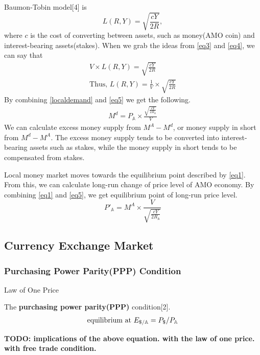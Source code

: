 \documentclass[a4paper,11pt]{scrartcl}
\newcommand{\usd}{\text{\textdollar}}
\newcommand{\amom}{\mathbb{A}}
\begin{document}
Baumon-Tobin model[4] is
\begin{equation}
	L(R, Y) = \sqrt{\frac{cY}{2R}}, \label{eq4}
\end{equation}
where $c$ is the cost of converting between assets, such as money(AMO coin) and
interest-bearing assets(stakes).
When we grab the ideas from \eqref{eq3} and \eqref{eq4}, we can say that
\begin{eqnarray}
	V \times L(R, Y) = \sqrt{\frac{cY}{2R}} \\
	\text{Thus,\ } L(R, Y) = \frac{1}{V} \times \sqrt{\frac{cY}{2R}} \label{eq5}
\end{eqnarray}
By combining \eqref{localdemand} and \eqref{eq5} we get the following.
\begin{eqnarray}
	M^d = P_\amom \times \frac{\sqrt{\frac{cY}{2R_\amom}}}{V}
\end{eqnarray}
We can calculate excess money supply from $M^A - M^d$, or money supply in short
from $M^d - M^A$. The excess money supply tends to be converted into
interest-bearing assets such as stakes, while the money supply in short tends
to be compensated from stakes.

Local money market moves towards the equilibrium point described by
\eqref{eq1}. From this, we can calculate long-run change of price level of AMO
economy. By combining \eqref{eq1} and \eqref{eq5}, we get equilibrium point of
long-run price level.
\begin{equation}
	P'_\amom = M^A \times \frac{V}{\sqrt{\frac{cY}{2R_\amom}}}
\end{equation}

\subsection{Currency Exchange Market}

\subsubsection{Purchasing Power Parity(PPP) Condition}
Law of One Price

The \textbf{purchasing power parity(PPP)} condition[2].
\begin{eqnarray}
	\text{equilibrium at\ } E_{\usd/\amom} = P_\usd / P_\amom \label{eq:3}
\end{eqnarray}

\textbf{TODO: implications of the above equation. with the law of one price.
with free trade condition.}
\end{document}
